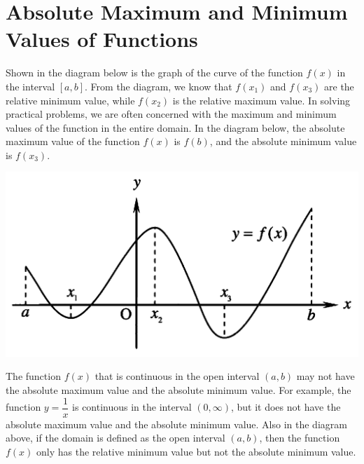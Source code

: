 


\section{Absolute Maximum and Minimum Values of Functions}

Shown in the diagram below is the graph of the curve of the function $f(x)$ in
the interval $[a, b]$. From the diagram, we know that $f(x_1)$ and $f(x_3)$ are
the relative minimum value, while $f(x_2)$ is the relative maximum value. In
solving practical problems, we are often concerned with the maximum and minimum
values of the function in the entire domain. In the diagram below, the absolute
maximum value of the function $f(x)$ is $f(b)$, and the absolute minimum value
is $f(x_3)$.
\begin{center}
    \includegraphics[scale=0.25]{assets/26-8.png}
\end{center}

\begin{center}
\end{center}

The function $f(x)$ that is continuous in the open interval $(a, b)$ may not
have the absolute maximum value and the absolute minimum value. For example,
the function $y = \dfrac{1}{x}$ is continuous in the interval $(0, \infty)$,
but it does not have the absolute maximum value and the absolute minimum value.
Also in the diagram above, if the domain is defined as the open interval $(a,
    b)$, then the function $f(x)$ only has the relative minimum value but not the
absolute minimum value.

